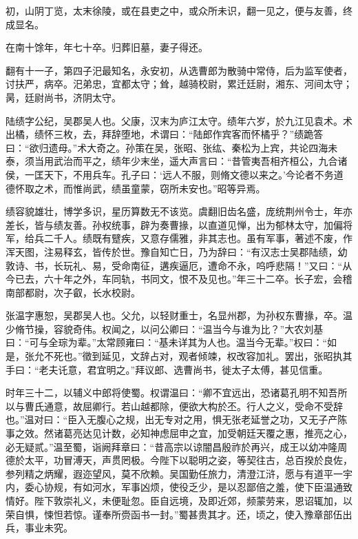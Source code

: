 \documentclass[12pt,UTF8]{ctexbook}
\begin{document}
初，山阴丁览，太末徐陵，或在县吏之中，或众所未识，翻一见之，便与友善，终成显名。

在南十馀年，年七十卒。归葬旧墓，妻子得还。

翻有十一子，第四子汜最知名，永安初，从选曹郎为散骑中常侍，后为监军使者，讨扶严，病卒。汜弟忠，宜都太守；耸，越骑校尉，累迁廷尉，湘东、河间太守；昺，廷尉尚书，济阴太守。

陆绩字公纪，吴郡吴人也。父康，汉末为庐江太守。绩年六岁，於九江见袁术。术出橘，绩怀三枚，去，拜辞堕地，术谓曰：“陆郎作宾客而怀橘乎？”绩跪答曰：“欲归遗母。”术大奇之。孙策在吴，张昭、张纮、秦松为上宾，共论四海未泰，须当用武治而平之，绩年少末坐，遥大声言曰：“昔管夷吾相齐桓公，九合诸侯，一匡天下，不用兵车。孔子曰：‘远人不服，则脩文德以来之。’今论者不务道德怀取之术，而惟尚武，绩虽童蒙，窃所未安也。”昭等异焉。

绩容貌雄壮，博学多识，星历算数无不该览。虞翻旧齿名盛，庞统荆州令士，年亦差长，皆与绩友善。孙权统事，辟为奏曹掾，以直道见惮，出为郁林太守，加偏将军，给兵二千人。绩既有躄疾，又意存儒雅，非其志也。虽有军事，著述不废，作浑天图，注易释玄，皆传於世。豫自知亡日，乃为辞曰：“有汉志士吴郡陆绩，幼敦诗、书，长玩礼、易，受命南征，遘疾逼厄，遭命不永，呜呼悲隔！”又曰：“从今已去，六十年之外，车同轨，书同文，恨不及见也。”年三十二卒。长子宏，会稽南部都尉，次子叡，长水校尉。

张温字惠恕，吴郡吴人也。父允，以轻财重士，名显州郡，为孙权东曹掾，卒。温少脩节操，容貌奇伟。权闻之，以问公卿曰：“温当今与谁为比？”大农刘基曰：“可与全琮为辈。”太常顾雍曰：“基未详其为人也。温当今无辈。”权曰：“如是，张允不死也。”徵到延见，文辞占对，观者倾竦，权改容加礼。罢出，张昭执其手曰：“老夫讬意，君宜明之。”拜议郎、选曹尚书，徙太子太傅，甚见信重。

时年三十二，以辅义中郎将使蜀。权谓温曰：“卿不宜远出，恐诸葛孔明不知吾所以与曹氏通意，故屈卿行。若山越都除，便欲大构於丕。行人之义，受命不受辞也。”温对曰：“臣入无腹心之规，出无专对之用，惧无张老延誉之功，又无子产陈事之效。然诸葛亮达见计数，必知神虑屈申之宜，加受朝廷天覆之惠，推亮之心，必无疑贰。”温至蜀，诣阙拜章曰：“昔高宗以谅闇昌殷祚於再兴，成王以幼冲隆周德於太平，功冒溥天，声贯罔极。今陛下以聪明之姿，等契往古，总百揆於良佐，参列精之炳耀，遐迩望风，莫不欣赖。吴国勤任旅力，清澄江浒，愿与有道平一宇内，委心协规，有如河水，军事凶烦，使役乏少，是以忍鄙倍之羞，使下臣温通致情好。陛下敦崇礼义，未便耻忽。臣自远境，及即近郊，频蒙劳来，恩诏辄加，以荣自惧，悚怛若惊。谨奉所赍函书一封。”蜀甚贵其才。还，顷之，使入豫章部伍出兵，事业未究。
\end{document}
